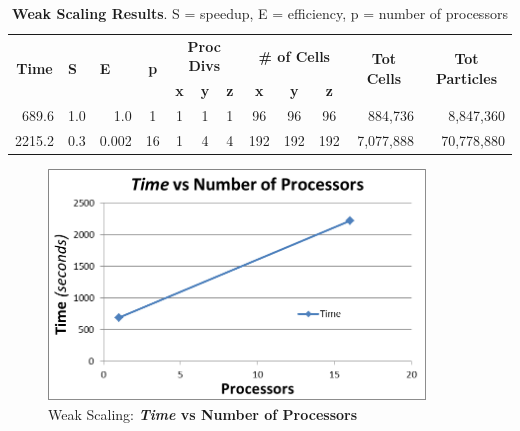 \documentclass[]{article}
\begin{document}
\begin{table}[h!]
\centering
\begin{tabular}{|r|r|r|c|c|c|c|c|c|c|r|r|}
\hline
\multicolumn{1}{|c|}{\multirow{2}{*}{\textbf{Time}}} & \multicolumn{1}{l|}{\multirow{2}{*}{\textbf{S}}} & \multicolumn{1}{l|}{\multirow{2}{*}{\textbf{E}}} & \multirow{2}{*}{\textbf{p}} & \multicolumn{3}{c|}{\textbf{Proc Divs}} & \multicolumn{3}{c|}{\textbf{\# of Cells}} & \multicolumn{1}{c|}{\multirow{2}{*}{\textbf{Tot Cells}}} & \multicolumn{1}{c|}{\multirow{2}{*}{\textbf{Tot Particles}}} \\ \cline{5-10}
\multicolumn{1}{|c|}{}                               & \multicolumn{1}{l|}{}                            & \multicolumn{1}{l|}{}                            &                             & \textbf{x}  & \textbf{y}  & \textbf{z}  & \textbf{x}   & \textbf{y}   & \textbf{z}  & \multicolumn{1}{c|}{}                                    & \multicolumn{1}{c|}{}                                        \\ \hline
689.6                                                    & 1.0                                                & 1.0                                                & 1                           & 1           & 1           & 1           & 96           & 96           & 96          & 884,736                                                  & 8,847,360                                                    \\ \hline
2215.2                                                 & 0.3                                                & 0.002                                                & 16                          & 1           & 4           & 4           & 192          & 192          & 192         & 7,077,888                                                & 70,778,880                                                    \\ \hline
\end{tabular}
\caption{\textbf{Weak Scaling Results}. S = speedup, E = efficiency, p = number of processors}
\end{table}

\begin{figure}[h!]
    \centering
    \includegraphics[width=10cm]{weak_times.png}
    \caption{Weak Scaling: \textbf{\textit{Time} vs Number of Processors}}
\end{figure}
\end{document}
